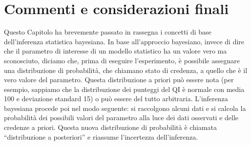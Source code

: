 \documentclass[
  11pt,
]{krantz}
\theoremstyle{definition}
\theoremstyle{definition}
\theoremstyle{definition}
\theoremstyle{definition}
\theoremstyle{remark}
\begin{document}
\hypertarget{commenti-e-considerazioni-finali-3}{%
\section*{Commenti e considerazioni finali}\label{commenti-e-considerazioni-finali-3}}


Questo Capitolo ha brevemente passato in rassegna i concetti di base dell'inferenza statistica bayesiana. In base all'approccio bayesiano, invece di dire che il parametro di interesse di un modello statistico ha un valore vero ma sconosciuto, diciamo che, prima di eseguire l'esperimento, è possibile assegnare una distribuzione di probabilità, che chiamano stato di credenza, a quello che è il vero valore del parametro. Questa distribuzione a priori può essere nota (per esempio, sappiamo che la distribuzione dei punteggi del QI è normale con media 100 e deviazione standard 15) o può essere del tutto arbitraria. L'inferenza bayesiana procede poi nel modo seguente: si raccolgono alcuni dati e si calcola la probabilità dei possibili valori del parametro alla luce dei dati osservati e delle credenze a priori. Questa nuova distribuzione di probabilità è chiamata ``distribuzione a posteriori'' e riassume l'incertezza dell'inferenza.

  

\printindex
\end{document}

